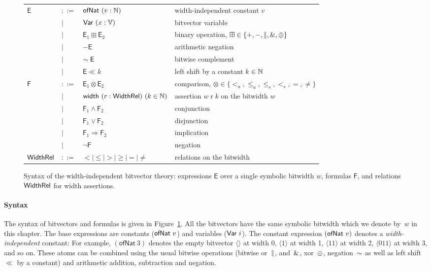 \begin{figure}[tb]
\centering
{\footnotesize
\begin{tabular}{llll}
$\mathsf{E}$ & $::=$ & $\mathsf{ofNat}~(v : \mathbb N)$ & width-independent constant $v$ \\
    & $\mid$ & $\mathsf{Var}~(x : \mathbb V)$ & bitvector variable \\
    & $\mid$ & $\mathsf{E}_1 \boxplus \mathsf{E}_2$ & binary operation, $\boxplus \in \{+, -, \|, \mathbin{\&}, \oplus\}$ \\
    & $\mid$ & $- \mathsf{E}$ & arithmetic negation \\
    & $\mid$ & $\sim \mathsf{E}$ & bitwise complement \\
    & $\mid$ & $\mathsf{E} \ll k$ & left shift by a constant $k \in \mathbb N$ \\[4pt]
$\mathsf{F}$ & $::=$ & $\mathsf{E}_1 \otimes \mathsf{E}_2$ & comparison, $\otimes \in \{<_u, \leq_u, \leq_s, <_s, =, \neq \}$ \\
    & $\mid$ & $\textsf{width}~(r : \textsf{WidthRel})~(k \in \mathbb N)$ & assertion $w \mathrel{r} k$ on the bitwidth $w$ \\
    & $\mid$ & $\mathsf{F}_1 \land \mathsf{F}_2$ & conjunction \\
    & $\mid$ & $\mathsf{F}_1 \lor \mathsf{F}_2$ & disjunction \\
    & $\mid$ & $\mathsf{F}_1 \Rightarrow \mathsf{F}_2$ & implication \\
    & $\mid$ & $\neg \mathsf{F}$ & negation \\[4pt]
$\textsf{WidthRel}$ & $::=$ & ${<} \mid {\leq} \mid {>} \mid {\geq} \mid {=} \mid {\neq}$ & relations on the bitwidth \\
\end{tabular}
}
  \caption{Syntax of the width-independent bitvector theory: expressions
  $\mathsf{E}$ over a single symbolic bitwidth $w$, formulas $\mathsf{F}$, and
  relations $\textsf{WidthRel}$ for width assertions.}
  \label{fig:swbv:syntax-formula}
\end{figure}

\paragraph{Syntax}
The syntax of bitvectors and formulas is given in
Figure~\ref{fig:swbv:syntax-formula}.
%
All the bitvectors have the same symbolic bitwidth which we denote by~$w$ in
this chapter.
%
The base expressions are constants ($\mathsf{ofNat}~v$) and variables ($\mathsf{Var}~i$).
The constant expression $(\mathsf{ofNat}~v)$ denotes a \emph{width-independent}
constant: For example, $(\mathsf{ofNat}~3)$ denotes the empty bitvector $\langle
\rangle$ at width 0,  $\langle1\rangle$ at width 1, $\langle 11 \rangle$ at
width 2, $\langle 011 \rangle$ at width 3, and so on. These atoms can be
combined using the usual bitwise operations (bitwise or~$\|$, and~$\mathbin{\&}$,
xor~$\oplus$, negation~$\sim$ as well as left shift $\ll$ by a constant) and
arithmetic addition, subtraction and negation.

